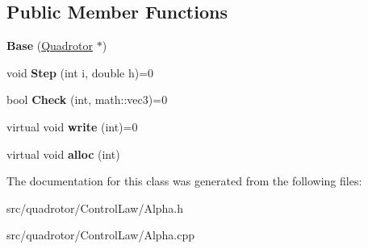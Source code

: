 \subsection*{\-Public \-Member \-Functions}
\begin{DoxyCompactItemize}
\item 
\hypertarget{classAlpha1_1_1Base_aa3a30d6a7eb5a05d313a17c3aadfbc46}{{\bfseries \-Base} (\hyperlink{classQuadrotor}{\-Quadrotor} $\ast$)}\label{classAlpha1_1_1Base_aa3a30d6a7eb5a05d313a17c3aadfbc46}

\item 
\hypertarget{classAlpha1_1_1Base_a8b2ac7103a87426eca6243d7e00a62a4}{void {\bfseries \-Step} (int i, double h)=0}\label{classAlpha1_1_1Base_a8b2ac7103a87426eca6243d7e00a62a4}

\item 
\hypertarget{classAlpha1_1_1Base_a760efb3a3d35444c4eaa465f9d39fd0f}{bool {\bfseries \-Check} (int, math\-::vec3)=0}\label{classAlpha1_1_1Base_a760efb3a3d35444c4eaa465f9d39fd0f}

\item 
\hypertarget{classAlpha1_1_1Base_a73c402f3bcb3d5b1cd97f867bd47a847}{virtual void {\bfseries write} (int)=0}\label{classAlpha1_1_1Base_a73c402f3bcb3d5b1cd97f867bd47a847}

\item 
\hypertarget{classAlpha1_1_1Base_a7039181204826d9000f98f3acc59938f}{virtual void {\bfseries alloc} (int)}\label{classAlpha1_1_1Base_a7039181204826d9000f98f3acc59938f}

\end{DoxyCompactItemize}


\-The documentation for this class was generated from the following files\-:\begin{DoxyCompactItemize}
\item 
src/quadrotor/\-Control\-Law/\-Alpha.\-h\item 
src/quadrotor/\-Control\-Law/\-Alpha.\-cpp\end{DoxyCompactItemize}
